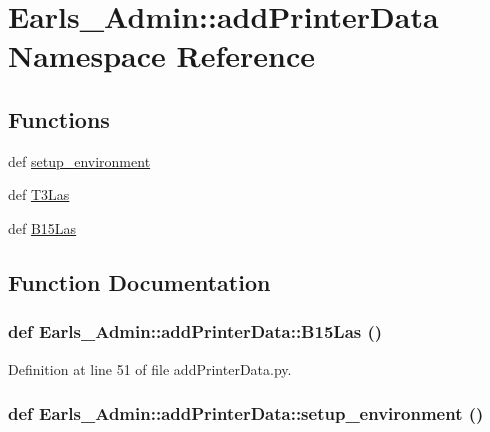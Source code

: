 \hypertarget{namespaceEarls__Admin_1_1addPrinterData}{
\section{Earls\_\-Admin::addPrinterData Namespace Reference}
\label{namespaceEarls__Admin_1_1addPrinterData}
}


\subsection*{Functions}
\begin{CompactItemize}
\item 
def \hyperlink{namespaceEarls__Admin_1_1addPrinterData_a685f1ec828ed95d074b3bbe447b4607}{setup\_\-environment}
\item 
def \hyperlink{namespaceEarls__Admin_1_1addPrinterData_5e761e876d75917a09b140eb58e6e7ab}{T3Las}
\item 
def \hyperlink{namespaceEarls__Admin_1_1addPrinterData_bb80bf066b98ba32f648a537ac252f22}{B15Las}
\end{CompactItemize}


\subsection{Function Documentation}
\hypertarget{namespaceEarls__Admin_1_1addPrinterData_bb80bf066b98ba32f648a537ac252f22}{
\subsubsection[B15Las]{\setlength{\rightskip}{0pt plus 5cm}def Earls\_\-Admin::addPrinterData::B15Las ()}}
\label{namespaceEarls__Admin_1_1addPrinterData_bb80bf066b98ba32f648a537ac252f22}




Definition at line 51 of file addPrinterData.py.\hypertarget{namespaceEarls__Admin_1_1addPrinterData_a685f1ec828ed95d074b3bbe447b4607}{
\subsubsection[setup\_\-environment]{\setlength{\rightskip}{0pt plus 5cm}def Earls\_\-Admin::addPrinterData::setup\_\-environment ()}}
\label{namespaceEarls__Admin_1_1addPrinterData_a685f1ec828ed95d074b3bbe447b4607}




